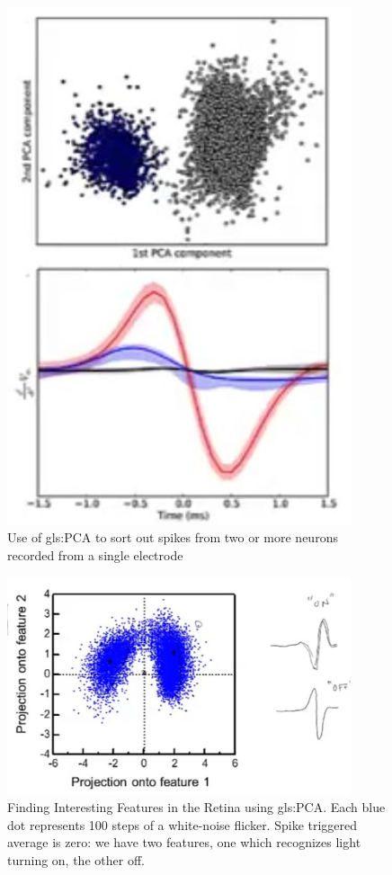 \documentclass[]{article}
\begin{document}
\begin{figure}[H]
	\caption[Use of \gls{gls:PCA} to sort out spikes]{Use of \gls{gls:PCA} to sort out spikes from two or more neurons recorded from a single electrode}
	\includegraphics[width=0.9\textwidth]{pca-spike-sorting}
\end{figure}

\begin{figure}[H]
	\caption[Finding Interesting Features in the Retina using \gls{gls:PCA}]{Finding Interesting Features in the Retina using \gls{gls:PCA}. Each blue dot represents 100 steps of a white-noise flicker. Spike triggered average is zero: we have two features, one which recognizes light turning on, the other off.}
	\includegraphics[width=0.9\textwidth]{finding-interestimg-features}
\end{figure}
\end{document}
